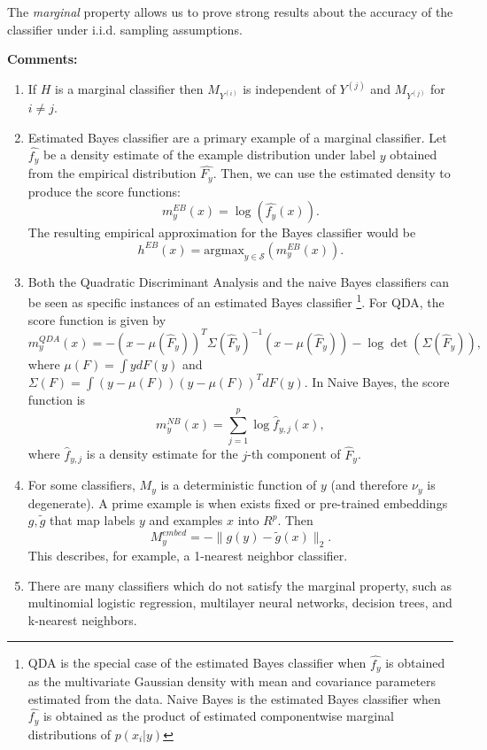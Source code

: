 \documentclass[twoside,11pt]{article}
\begin{document}
The \emph{marginal} property allows us to prove
strong results about the accuracy of the classifier under
i.i.d. sampling assumptions.


\textbf{Comments:}
\begin{enumerate}
\item If $H$ is a marginal classifier then 
$M_{Y^{(i)}}$ is independent of $Y^{(j)}$ and $M_{Y^{(j)}}$ for $i \neq j$.
\item Estimated Bayes
classifier are a primary example of a marginal classifier. Let $\hat{f_y}$ be a density estimate of the example distribution under label $y$ obtained from the
empirical distribution $\hat{F_y}$. Then, we can use the estimated
density to produce the score functions:
\[ m^{EB}_y(x) = \log(\hat{f_{y}}(x)).\]
The resulting empirical approximation for the Bayes classifier would be
\[ h^{EB}(x) = \text{argmax}_{y \in \mathcal{S}}(m^{EB}_y(x)).\]
\item Both the Quadratic Discriminant Analysis and the naive Bayes classifiers can be seen as specific instances of an estimated Bayes classifier
\footnote{QDA is the special case of the estimated Bayes classifier when $\hat{f_y}$ is obtained as
the multivariate Gaussian density with mean and covariance parameters estimated from the data.
Naive Bayes is the estimated Bayes classifier when $\hat{f_y}$ is obtained as the product of estimated componentwise marginal distributions
of $p(x_i|y)$}. 
For QDA, the score function is
given by
\[
m_y^{QDA}(x) = -(x - \mu(\hat{F}_y))^T \Sigma(\hat{F}_y)^{-1} (x-\mu(\hat{F}_y)) - \log\det(\Sigma(\hat{F}_y)),
\]
where $\mu(F) = \int y dF(y)$ and $\Sigma(F) = \int (y-\mu(F))(y-\mu(F))^T dF(y)$.
In Naive Bayes, the score function is
\[
m^{NB}_y(x) = \sum_{j=1}^p \log \hat{f}_{y, j}(x),
\]
where $\hat{f}_{y, j}$ is a density estimate for the $j$-th component of
$\hat{F}_y$.
\item For some classifiers, $M_y$ is a deterministic function of $y$ (and therefore $\nu_y$ is degenerate). A prime example is when exists fixed or pre-trained embeddings $g, \tilde{g}$ that map labels $y$ and examples $x$ into
 $R^p$. Then 
\begin{equation}
M_y^{embed} = -\|g(y) - \tilde{g}(x)\|_2.
\end{equation}
This describes, for example, a 1-nearest neighbor classifier.
\item There are many classifiers which do not satisfy the marginal property, such as multinomial logistic regression, multilayer neural networks, decision trees, and k-nearest neighbors.
\end{enumerate}
\end{document}

